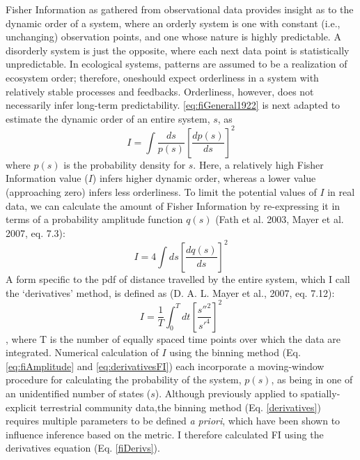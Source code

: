 \documentclass[12pt,twoside,openany]{reedthesis}
\begin{document}
Fisher Information as gathered from observational data provides insight
as to the dynamic order of a system, where an orderly system is one with
constant (i.e., unchanging) observation points, and one whose nature is
highly predictable. A disorderly system is just the opposite, where each
next data point is statistically unpredictable. In ecological systems,
patterns are assumed to be a realization of ecosystem order; therefore,
oneshould expect orderliness in a system with relatively stable
processes and feedbacks. Orderliness, however, does not necessarily
infer long-term predictability. \eqref{eq:fiGeneral1922} is next adapted
to estimate the dynamic order of an entire system, \(s\), as
\begin{equation} 
I = \int \frac{ds}{p(s)}\left[\frac{dp(s)}{ds}\right]^2
\end{equation}
where \(p(s)\) is the probability density for \(s\). Here, a relatively
high Fisher Information value (\(I\)) infers higher dynamic order,
whereas a lower value (approaching zero) infers less orderliness. To
limit the potential values of \(I\) in real data, we can calculate the
amount of Fisher Information by re-expressing it in terms of a
probability amplitude function \(q(s)\) (Fath et al. 2003, Mayer et al.
2007, eq. 7.3):
\begin{equation}
I = 4 \int ds\left[\frac{dq(s)}{ds}\right]^2
\end{equation}
A form specific to the pdf of distance travelled by the entire system,
which I call the `derivatives' method, is defined as (D. A. L. Mayer et
al., 2007, eq. 7.12):
\begin{equation}
I = \frac{1}{T} \int_0^T dt\left[\frac{s''^2}{s'^4}\right]^2
\end{equation}
, where T is the number of equally spaced time points over which the
data are integrated. Numerical calculation of \(I\) using the binning
method (Eq. \eqref{eq:fiAmplitude} and \eqref{eq:derivativesFI}) each
incorporate a moving-window procedure for calculating the probability of
the system, \(p(s)\), as being in one of an unidentified number of
states (\(s\)). Although previously applied to spatially-explicit
terrestrial community data,the binning method (Eq. \ref{derivatives})
requires multiple parameters to be defined \emph{a priori}, which have
been shown to influence inference based on the metric. I therefore
calculated FI using the derivatives equation (Eq. \ref{fiDerivs}).
\end{document}
